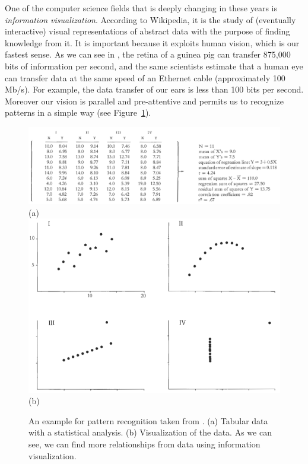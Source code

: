 One of the computer science fields that is deeply changing in these years is \textit{information visualization}. According to Wikipedia, it is the study of (eventually interactive) visual representations of abstract data with the purpose of finding knowledge from it. It is important because it exploits human vision, which is our fastest sense. As we can see in \cite{Koch}, the retina of a guinea pig can transfer 875,000 bits of information per second, and the same scientists estimate that a human eye can transfer data at the same speed of an Ethernet cable (approximately  100 Mb/s). For example, the data transfer of our ears is less than 100 bits per second. Moreover our vision is parallel and pre-attentive and permits us to recognize patterns in a simple way (see Figure~\ref{fig:TufteExample}).

\begin{figure}[htb] %
   \centering
   \includegraphics[width=0.80\linewidth]{images/TufteExample0.png}\\
   (a)\\
   \includegraphics[width=0.80\linewidth]{images/TufteExample1.png}\\
   (b)
   \caption[Tufte example for pattern recognition]{An example for pattern recognition taken from \cite{Tufte}. (a) Tabular data with a statistical analysis. (b) Visualization of the data. As we can see, we can find more relationships from data using information visualization.}
   \label{fig:TufteExample}
\end{figure}

